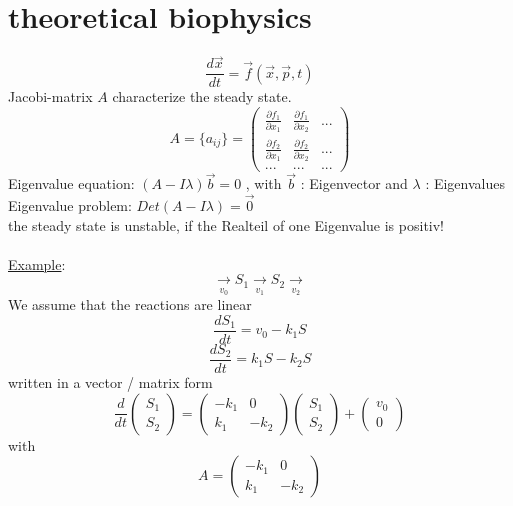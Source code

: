 \documentclass[12pt,a4paper,bibliography=totocnumbered]{scrartcl}
\begin{document}
\section{theoretical biophysics}
\begin{equation*}
\frac{d\vec{x}}{dt} = \vec{f}(\vec{x},\vec{p},t)
\end{equation*}
Jacobi-matrix $A$ characterize the steady state.
\begin{equation*}
A = \{a_{ij} \}  =  
\begin{pmatrix}
\frac{\partial f_1 }{\partial x_1}& \frac{\partial f_1 }{\partial x_2} & ... \\
\frac{\partial f_2 }{\partial x_1} & \frac{\partial f_2 }{\partial x_2} & ... \\
... & ... & ...
\end{pmatrix}
\end{equation*}
Eigenvalue equation: $(A-I\lambda)\vec{b}=0$ , with $\vec{b}$ : Eigenvector and $\lambda$ : Eigenvalues\\
Eigenvalue problem: $Det(A-I\lambda)= \vec{0}$\\
the steady state is unstable, if the Realteil of one Eigenvalue is positiv! \\\\
\underline{Example}:  
\begin{equation*}
\underset{v_0}{\rightarrow} S_1 \underset{v_1}{\rightarrow} S_2 \underset{v_2}{\rightarrow} 
\end{equation*}
We assume that the reactions are linear
\begin{equation*}
\frac{dS_1}{dt} = v_0 - k_1S
\end{equation*}
\begin{equation*}
\frac{dS_2}{dt} = k_1S -k_2S
\end{equation*}
written in a vector / matrix form
\begin{equation*}
\frac{d}{dt} \begin{pmatrix} S_1 \\ S_2 \end{pmatrix} = 
\begin{pmatrix} -k_1 & 0 \\ k_1 & -k_2 \end{pmatrix}  \begin{pmatrix} S_1 \\ S_2 \end{pmatrix} 
+  \begin{pmatrix} v_0 \\ 0 \end{pmatrix}
\end{equation*}
with 
\begin{equation*}
	A  = \begin{pmatrix} -k_1 & 0 \\ k_1 & -k_2 \end{pmatrix} 
\end{equation*}
\end{document}
